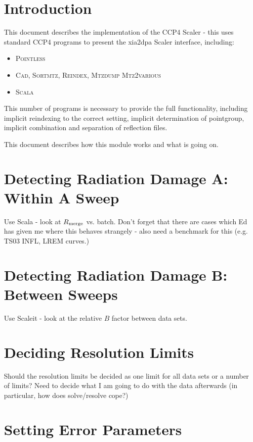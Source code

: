 \documentclass[a4paper, 11pt]{article}
\begin{document}
\section{Introduction}

This document describes the implementation of the CCP4 Scaler - this uses 
standard CCP4 programs to present the xia2dpa Scaler interface, including:

\begin{itemize}
\item{\textsc{Pointless}}
\item{\textsc{Cad}, \textsc{Sortmtz}, \textsc{Reindex}, \textsc{Mtzdump}
\textsc{Mtz2various}}
\item{\textsc{Scala}}
\end{itemize}

\noindent
This number of programs is necessary to provide the full functionality,
including implicit reindexing to the correct setting, implicit determination
of pointgroup, implicit combination and separation of reflection files.

This document describes how this module works and what is going on.

\section{Detecting Radiation Damage A: Within A Sweep}

Use Scala - look at $R_{\rm{merge}}$ vs. batch. Don't forget that there 
are cases which Ed has given me where this behaves strangely - also need
a benchmark for this (e.g. TS03 INFL, LREM curves.)

\section{Detecting Radiation Damage B: Between Sweeps}

Use Scaleit - look at the relative $B$ factor between data sets.

\section{Deciding Resolution Limits}

Should the resolution limits be decided as one limit for all data sets or
a number of limits? Need to decide what I am going to do with the data 
afterwards (in particular, how does solve/resolve cope?)



\section{Setting Error Parameters}
\end{document}
